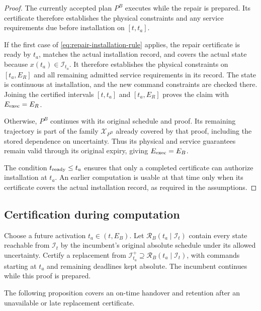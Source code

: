 \documentclass[preprint,12pt]{elsarticle}
\begin{document}
\begin{proof}
The currently accepted plan $P^B$ executes while the repair is prepared.
Its certificate therefore establishes the physical constraints and any
service requirements due before installation on $[t,t_a]$.

If the first case of \eqref{eq:repair-installation-rule} applies, the
repair certificate is ready by $t_a$, matches the actual installation
record, and covers the actual state because
$x(t_a)\in\mathcal I_{t_a}$. It therefore establishes the physical
constraints on $[t_a,E_R]$ and all remaining admitted service requirements
in its record. The state is continuous at installation, and the new
command constraints are checked there. Joining the certified intervals
$[t,t_a]$ and $[t_a,E_R]$ proves the claim with $E_{\rm exec}=E_R$.

Otherwise, $P^B$ continues with its original schedule and proof. Its
remaining trajectory is part of the family $\mathcal X_{P^B}$ already
covered by that proof, including the stored dependence on uncertainty.
Thus its physical and service guarantees remain valid through its
original expiry, giving $E_{\rm exec}=E_B$.

The condition $t_{\rm ready}\le t_a$ ensures that only a completed
certificate can authorize installation at $t_a$. An earlier computation
is usable at that time only when its certificate covers the actual
installation record, as required in the assumptions.
\end{proof}

\subsection{Certification during computation}
\label{sec:planned-handover}

Choose a future activation $t_a\in(t,E_B)$. Let
$\mathcal R_B(t_a\mid\mathcal I_t)$ contain every state reachable from
$\mathcal I_t$ by the incumbent's original absolute schedule under its
allowed uncertainty. Certify a replacement from
$\mathcal I_{t_a}^+\supseteq\mathcal R_B(t_a\mid\mathcal I_t)$, with commands
starting at $t_a$ and remaining deadlines kept absolute. The incumbent
continues while this proof is prepared.

The following proposition covers an on-time handover and retention after
an unavailable or late replacement certificate.
\end{document}
